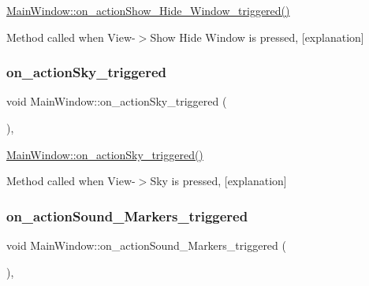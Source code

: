 \hyperlink{class_main_window_a3de1a7a9eb5798b608bdb9fad1a442b5}{Main\+Window\+::on\+\_\+action\+Show\+\_\+\+Hide\+\_\+\+Window\+\_\+triggered()} 

Method called when View-\/$>$Show Hide Window is pressed, \mbox{[}explanation\mbox{]} \mbox{\label{class_main_window_aa4301fd4cad1597fad079ee7eebbd14a}} 
\subsubsection{\texorpdfstring{on\+\_\+action\+Sky\+\_\+triggered}{on\_actionSky\_triggered}}
{\footnotesize\ttfamily void Main\+Window\+::on\+\_\+action\+Sky\+\_\+triggered (\begin{DoxyParamCaption}{ }\end{DoxyParamCaption})\hspace{0.3cm}{\ttfamily [private]}, {\ttfamily [slot]}}



\hyperlink{class_main_window_aa4301fd4cad1597fad079ee7eebbd14a}{Main\+Window\+::on\+\_\+action\+Sky\+\_\+triggered()} 

Method called when View-\/$>$Sky is pressed, \mbox{[}explanation\mbox{]} \mbox{\label{class_main_window_a4b49e5d0db6f503d31748bf48c3179e7}} 
\subsubsection{\texorpdfstring{on\+\_\+action\+Sound\+\_\+\+Markers\+\_\+triggered}{on\_actionSound\_Markers\_triggered}}
{\footnotesize\ttfamily void Main\+Window\+::on\+\_\+action\+Sound\+\_\+\+Markers\+\_\+triggered (\begin{DoxyParamCaption}{ }\end{DoxyParamCaption})\hspace{0.3cm}{\ttfamily [private]}, {\ttfamily [slot]}}



